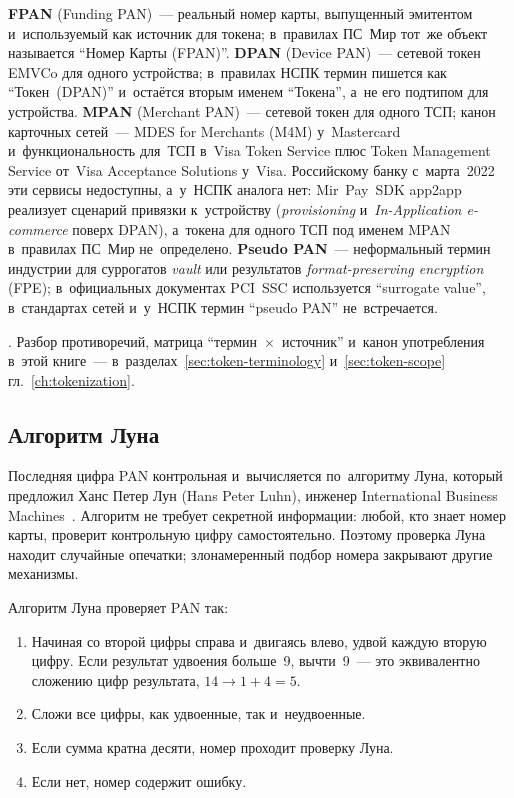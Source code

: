 \textbf{FPAN} (Funding PAN)~--- реальный номер карты, выпущенный эмитентом
и~используемый как источник для токена; в~правилах ПС~Мир тот~же объект
называется \enquote{Номер Карты (FPAN)}. \textbf{DPAN} (Device PAN)~--- сетевой
токен EMVCo для одного устройства; в~правилах НСПК термин пишется как
\enquote{Токен~(DPAN)} и~остаётся вторым именем \enquote{Токена}, а~не его
подтипом для устройства. \textbf{MPAN} (Merchant PAN)~--- сетевой токен для
одного ТСП; канон карточных сетей~--- MDES for Merchants (M4M) у~Mastercard
и~функциональность для~ТСП в~Visa Token Service плюс Token Management Service
от~Visa Acceptance Solutions у~Visa. Российскому банку с~марта~2022 эти
сервисы недоступны, а~у~НСПК аналога нет: Mir~Pay~SDK app2app реализует
сценарий привязки к~устройству (\textit{provisioning}
и~\textit{In-Application e-commerce} поверх DPAN), а~токена для одного ТСП под
именем MPAN в~правилах ПС~Мир не~определено. \textbf{Pseudo PAN}~---
неформальный термин индустрии для суррогатов \textit{vault} или результатов
\textit{format-preserving encryption} (FPE); в~официальных документах PCI~SSC
используется \enquote{surrogate value}, в~стандартах сетей и~у~НСПК термин
\enquote{pseudo PAN} не~встречается.

. Разбор противоречий,
матрица \enquote{термин~$\times$~источник} и~канон употребления в~этой
книге~--- в~разделах~\ref{sec:token-terminology} и~\ref{sec:token-scope}
гл.~\ref{ch:tokenization}.

\subsection*{Алгоритм Луна}

Последняя цифра PAN контрольная и~вычисляется по~алгоритму Луна, который
предложил Ханс Петер Лун (Hans Peter Luhn), инженер International Business
Machines~\cite{luhn-patent}. Алгоритм не требует секретной информации: любой,
кто знает номер карты, проверит контрольную цифру самостоятельно. Поэтому
проверка Луна находит случайные опечатки; злонамеренный подбор номера
закрывают другие механизмы.

Алгоритм Луна проверяет PAN так:

\begin{enumerate}
  \item Начиная со второй цифры справа и~двигаясь влево, удвой каждую вторую
    цифру. Если результат удвоения больше~9, вычти~9~--- это эквивалентно
    сложению цифр результата, $14 \to 1 + 4 = 5$.
  \item Сложи все цифры, как удвоенные, так и~неудвоенные.
  \item Если сумма кратна десяти, номер проходит проверку Луна.
  \item Если нет, номер содержит ошибку.
\end{enumerate}

